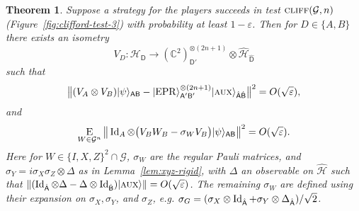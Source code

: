 \documentclass[11pt]{article}
\newtheorem{theorem}{Theorem}
\theoremstyle{remark}
\theoremstyle{definition}
\newcommand{\ket}[1]{|#1\rangle}
\newcommand{\Id}{\ensuremath{\mathop{\rm Id}\nolimits}}
\newcommand{\Es}[1]{\ensuremath{\mathop{\textsc{E}}_{#1}}}
\newcommand{\reg}[1]{{\textsf{#1}}}
\newcommand{\C}{\ensuremath{\mathbb{C}}}
\newcommand{\mH}{\mathcal{H}}
\newcommand{\setft}[1]{\mathrm{#1}}
\newcommand{\Obs}{\setft{Obs}}
\newcommand{\eps}{\varepsilon}
\newcommand{\EPR}{{\rm EPR}}
\newcommand{\aux}{\textsc {aux}}
\newcommand{\cliff}{\textsc{cliff}}
\begin{document}
\begin{theorem}\label{thm:clifford-ntest}
Suppose a strategy for the players succeeds in test $\cliff(\mathcal{G},n)$ (Figure~\ref{fig:clifford-test-3}) with probability at least $1-\eps$. Then  for $D\in\{A,B\}$ there exists an isometry 
$$V_D: \mathcal{H}_\reg{D} \to (\C^2)^{\otimes (2n+1)}_{\reg{D}'} \otimes \hat{\mH}_{\hat{\reg{D}}}$$
such that 
\begin{equation}\label{eq:psi-epr}
\big\| (V_A \otimes V_B) \ket{\psi}_{\reg{AB}} - \ket{\EPR}_{\reg{A}'\reg{B}'}^{\otimes (2n+1)} \ket{\aux}_{\hat{\reg{A}}\hat{\reg{B}}} \big\|^2 = O(\sqrt{\eps}),
\end{equation}
and %
\begin{equation}\label{eq:clifford-ntest-close}
\Es{W\in\mathcal{G}^n} \big\| \Id_A \otimes \big( V_B W_B - \sigma_{W} V_B\big)   \ket{\psi}_{\reg{AB}} \big\|^2 = O(\sqrt{\eps}).
\end{equation}
Here for $W\in\{I,X,Z\}^2\cap \mathcal{G}$, $\sigma_W$ are the regular Pauli matrices, and $\sigma_Y = i\sigma_X\sigma_Z \otimes \Delta$ as in Lemma~\ref{lem:xyz-rigid}, with $\Delta$ an observable on $\hat{\mH}$ such that  $\|(\Id_{\hat{\reg{A}}}\otimes \Delta - \Delta\otimes\Id_{\hat{\reg{B}}})\ket{\aux}\|=O(\sqrt{\eps})$. The remaining $\sigma_W$ are defined using their expansion on $\sigma_X,\sigma_Y$, and $\sigma_Z$, e.g. $\sigma_G = (\sigma_X \otimes \Id_{\hat{\reg{A}}} + \sigma_Y\otimes \Delta_{\hat{\reg{A}}})/\sqrt{2}$.
\end{theorem}
\end{document}
